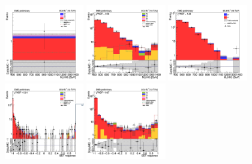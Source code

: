 \begin{figure}[tbp]
  \begin{center}
    \includegraphics[width=0.31\textwidth]{figures/ee_900_july20/hhMt_ee_SR_FullPostfit_plot_july20.png}
    \includegraphics[width=0.31\textwidth]{figures/ee_900_july20/hhMt_ee_CRDY_FullPostfit_plot_july20.png}
    \includegraphics[width=0.31\textwidth]{figures/ee_900_july20/hhMt_ee_CRTT_FullPostfit_plot_july20.png}\\
    \includegraphics[width=0.31\textwidth]{figures/ee_900_july20/bdt_response_ee_SR_FullPostfit_plot_july20.png}
    \includegraphics[width=0.31\textwidth]{figures/ee_900_july20/bdt_response_ee_CRDY_FullPostfit_plot_july20.png}

\end{center}
\end{figure}
